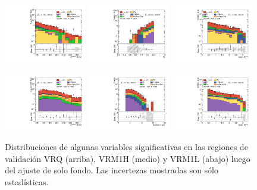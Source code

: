 \begin{figure}[ht!]
    \includegraphics[width=0.32\textwidth]{images/results/fr2_unblind/can_VRM1L_ph_pt0_afterFit.pdf}
    \includegraphics[width=0.32\textwidth]{images/results/fr2_unblind/can_VRM1L_rt4_afterFit.pdf}
    \includegraphics[width=0.32\textwidth]{images/results/fr2_unblind/can_VRM1L_dphi_jetmet_afterFit.pdf}

    \includegraphics[width=0.32\textwidth]{images/results/fr2_unblind/can_VRM1H_ph_pt0_afterFit.pdf}
    \includegraphics[width=0.32\textwidth]{images/results/fr2_unblind/can_VRM1H_jet_n_afterFit.pdf}
    \includegraphics[width=0.32\textwidth]{images/results/fr2_unblind/can_VRM1H_dphi_jetmet_afterFit.pdf}

    
    \caption{Distribuciones de algunas variables significativas en las regiones de validación VRQ (arriba), VRM1H (medio) y VRM1L (abajo) luego del ajuste de solo fondo. Las incertezas mostradas son sólo estadísticas.}
    \label{fig:dist_vrqm_bkgonly}
\end{figure}

